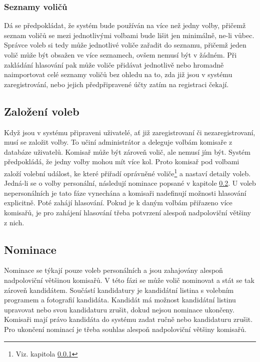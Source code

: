 \documentclass[11pt,twoside,a4paper]{book}
\begin{document}
\subsubsection{Seznamy voličů} \label{sec:seznamy}

Dá se předpokládat, že systém bude používán na více než jedny volby, přičemž seznam voličů se mezi jednotlivými volbami bude lišit jen minimálně, ne-li vůbec. Správce voleb si tedy může jednotlivé voliče zařadit do seznamu, přičemž jeden volič může být obsažen ve více seznamech, ovšem nemusí být v žádném. Při zakládání hlasování pak může voliče přidávat jednotlivě nebo hromadně naimportovat celé seznamy voličů bez ohledu na to, zda již jsou v systému zaregistrování, nebo jejich předpřipravené účty zatím na registraci čekají.

\subsection{Založení voleb}

Když jsou v systému připraveni uživatelé, ať již zaregistrovaní či nezaregistrovaní, musí se založit volby. To učiní administrátor a deleguje volbám komisaře z databáze uživatelů. Komisař může být zároveň volič, ale nemusí jím být. Systém předpokládá, že jedny volby mohou mít více kol. Proto komisař pod volbami založí volební událost, ke které přiřadí oprávněné voliče\footnote{Viz. kapitola \ref{sec:seznamy}} a nastaví detaily voleb. Jedná-li se o volby personální, následují nominace popsané v kapitole \ref{sec:nominace}. U voleb nepersonálních je tato fáze vynechána a komisaři nadefinují možnosti hlasování explicitně. Poté zahájí hlasování. Pokud je k daným volbám přiřazeno více komisařů, je pro zahájení hlasování třeba potvrzení alespoň nadpoloviční většiny z nich.

\subsection{Nominace} \label{sec:nominace}

Nominace se týkají pouze voleb personálních a jsou zahajovány alespoň nadpoloviční většinou komisařů. V této fázi se může volič nominovat a stát se tak zároveň kandidátem. Součástí kandidatury je kandidátní listina s volebním programem a fotografií kandidáta. Kandidát má možnost kandidátní listinu upravovat nebo svou kandidaturu zrušit, dokud nejsou nominace ukončeny. Komisaři mají právo kandidáta do systému zadat ručně nebo kandidaturu zrušit. Pro ukončení nominací je třeba souhlas alespoň nadpoloviční většiny komisařů. 
\end{document}

